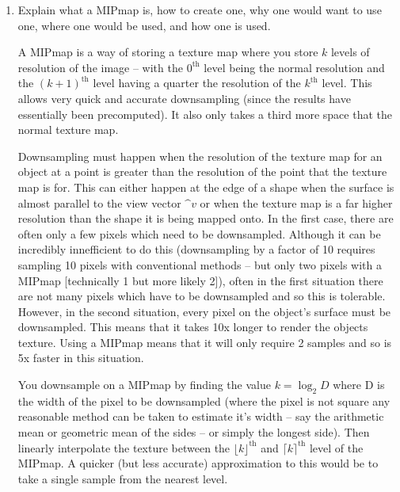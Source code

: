 \documentclass[10pt,\jkfside,a4paper]{article}
\begin{document}
\begin{enumerate}[label=(\alph*)]
\begin{examquestion}{2010}{4}{4}
\begin{enumerate}[label=(\alph*)]
\begin{enumerate}[label=(\roman*)]
Applying the matrix transformation $T$ to $A'B'C'D'$ gives the coordinates: 
$A'' = (11.5, -3.5)$, $B'' = (16, -8)$, $C'' = (20.5, -3.5)$ and $D'' = (16, 1)$

\end{enumerate} 

\end{enumerate}

\end{examquestion}

\item Explain what a MIPmap is, how to create one, why one would want to use one, where one 
would be used, and how one is used.

A MIPmap is a way of storing a texture map where you store $k$ levels of resolution of the image -- 
with the $0^\text{th}$ level being the normal resolution and the $(k + 1)^\text{th}$ level 
having a quarter the resolution of the $k^\text{th}$ level. This allows very quick and 
accurate downsampling (since the results have essentially been precomputed). It also only 
takes a third more space that the normal texture map.

Downsampling must happen when the resolution of the texture map for an object at a point is greater 
than the resolution of the point that the texture map is for. This can either happen at 
the edge of a shape when the surface is almost parallel 
to the view vector $\^v$ or when the texture map is a far higher resolution than the shape it is 
being mapped onto. In the first case, there are often only a few pixels which need to be downsampled. 
Although it can be incredibly innefficient to do this (downsampling by a factor of 10 requires sampling 
10 pixels with conventional methods -- but only two pixels with a MIPmap [technically 1 but more likely 2]), 
often in the first situation there are not many pixels which have to be downsampled and so this is tolerable. 
However, in the second situation, every pixel on the object's surface must be downsampled. This means that it 
takes 10x longer to render the objects texture. Using a MIPmap means that it will only require 2 samples and 
so is 5x faster in this situation.

You downsample on a MIPmap by finding the value $k = \log_2D$ where D is the width of the pixel to be 
downsampled (where the pixel is not square any reasonable method can be taken to estimate it's width -- 
say the arithmetic mean or geometric mean of the sides -- or simply the longest side). Then linearly 
interpolate the texture between the $\lfloor k\rfloor^\text{th}$ and $\lceil k\rceil^\text{th}$ level 
of the MIPmap. A quicker (but less accurate) approximation to this would be to take a single sample 
from the nearest level.

\end{enumerate}
\end{document}
